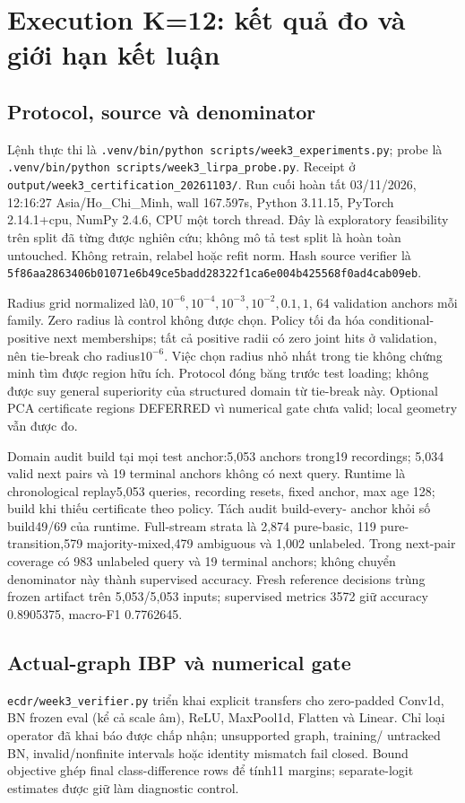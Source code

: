 \documentclass[11pt,a4paper]{article}
\newcommand{\code}[1]{{\small\ttfamily\nolinkurl{#1}}}
\theoremstyle{remark}
\begin{document}
\section{Execution K=12: kết quả đo và giới hạn kết luận}
\subsection{Protocol, source và denominator}
Lệnh thực thi là \code{.venv/bin/python scripts/week3_experiments.py};
probe là \code{.venv/bin/python scripts/week3_lirpa_probe.py}.
Receipt ở \code{output/week3_certification_20261103/}.
Run cuối hoàn tất 03/11/2026, 12:16:27 Asia/Ho\_Chi\_Minh, wall 167.597s,
Python 3.11.15, PyTorch 2.14.1+cpu, NumPy 2.4.6, CPU một torch thread.
Đây là exploratory feasibility trên split đã từng được nghiên cứu; không
mô tả test split là hoàn toàn untouched. Không retrain, relabel hoặc refit norm.
Hash source verifier là
\code{5f86aa2863406b01071e6b49ce5badd28322f1ca6e004b425568f0ad4cab09eb}.

Radius grid normalized là$0,10^{-6},10^{-4},10^{-3},10^{-2},0.1,1$,
64 validation anchors mỗi family. Zero radius là control không được chọn.
Policy tối đa hóa conditional-positive next memberships; tất cả positive
radii có zero joint hits ở validation, nên tie-break cho radius$10^{-6}$.
Việc chọn radius nhỏ nhất trong tie không chứng minh tìm được region hữu ích.
Protocol đóng băng trước test loading; không được suy general superiority
của structured domain từ tie-break này. Optional PCA certificate regions
DEFERRED vì numerical gate chưa valid; local geometry vẫn được đo.

Domain audit build tại mọi test anchor:5,053 anchors trong19 recordings;
5,034 valid next pairs và 19 terminal anchors không có next query.
Runtime là chronological replay5,053 queries, recording resets, fixed anchor,
max age 128; build khi thiếu certificate theo policy. Tách audit build-every-
anchor khỏi số build49/69 của runtime. Full-stream strata là 2,874 pure-basic,
119 pure-transition,579 majority-mixed,479 ambiguous và 1,002 unlabeled.
Trong next-pair coverage có 983 unlabeled query và 19 terminal anchors;
không chuyển denominator này thành supervised accuracy.
Fresh reference decisions trùng frozen artifact trên 5,053/5,053 inputs;
supervised metrics 3572 giữ accuracy 0.8905375, macro-F1 0.7762645.

\subsection{Actual-graph IBP và numerical gate}
\code{ecdr/week3_verifier.py} triển khai explicit transfers cho zero-padded
Conv1d, BN frozen eval (kể cả scale âm), ReLU, MaxPool1d, Flatten và Linear.
Chỉ loại operator đã khai báo được chấp nhận; unsupported graph, training/
untracked BN, invalid/nonfinite intervals hoặc identity mismatch fail closed.
Bound objective ghép final class-difference rows để tính11 margins;
separate-logit estimates được giữ làm diagnostic control.
\end{document}
